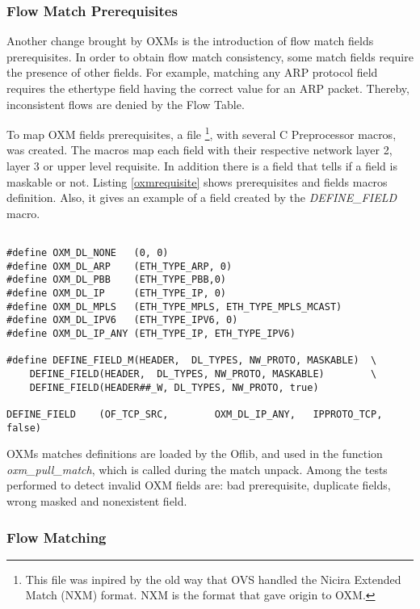     \subsubsection{Flow Match Prerequisites}
    
    Another change brought by OXMs is the introduction of flow match fields prerequisites. In order to obtain flow match consistency, some match fields require the presence of other fields. For example, matching any ARP protocol field requires the ethertype field having the correct value for an ARP packet. Thereby, inconsistent flows are denied by the Flow Table.  
      
    To map OXM fields prerequisites, a file \footnote{This file was inpired by the old way that OVS handled the Nicira Extended Match (NXM) format. NXM is the format that gave origin to OXM.}, with several C Preprocessor macros, was created. The macros map each field with their respective network layer 2, layer 3 or upper level requisite. In addition there is a field that tells if a field is maskable or not. Listing \ref{oxmrequisite} shows prerequisites and fields macros definition. Also, it gives an example of a field created by the \textit{DEFINE_FIELD} macro. 
\\
\begin{lstlisting}[caption={Ethernet parsing in the nbee_link module}, label=oxmrequisite,]

#define OXM_DL_NONE   (0, 0)
#define OXM_DL_ARP    (ETH_TYPE_ARP, 0)
#define OXM_DL_PBB    (ETH_TYPE_PBB,0)
#define OXM_DL_IP     (ETH_TYPE_IP, 0)
#define OXM_DL_MPLS   (ETH_TYPE_MPLS, ETH_TYPE_MPLS_MCAST)
#define OXM_DL_IPV6   (ETH_TYPE_IPV6, 0)
#define OXM_DL_IP_ANY (ETH_TYPE_IP, ETH_TYPE_IPV6)

#define DEFINE_FIELD_M(HEADER,  DL_TYPES, NW_PROTO, MASKABLE)  \
    DEFINE_FIELD(HEADER,  DL_TYPES, NW_PROTO, MASKABLE)        \
    DEFINE_FIELD(HEADER##_W, DL_TYPES, NW_PROTO, true)

DEFINE_FIELD    (OF_TCP_SRC,        OXM_DL_IP_ANY,   IPPROTO_TCP,    false)

\end{lstlisting}   

    OXMs matches definitions are loaded by the Oflib, and used in the function \textit{oxm_pull_match}, which is called during the match unpack. Among the tests performed to detect invalid OXM fields are: bad prerequisite, duplicate fields, wrong masked and nonexistent field.  

    \subsubsection{Flow Matching}
    
